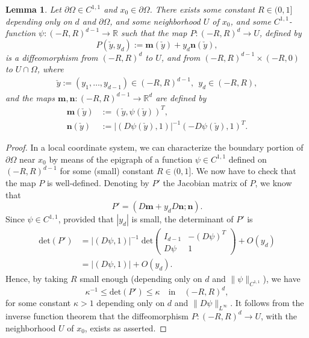\documentclass[10pt]{amsart}
\newtheorem{lemm}[theo]{Lemma}\newtheorem{prop}[theo]{Proposition}\newtheorem{coro}[theo]{Corollary}\newtheorem{conj}[theo]{Conjecture}
\theoremstyle{definition}\newtheorem{defi}[theo]{Definition}\newtheorem{rema}[theo]{Remark}\newtheorem{exam}[theo]{Example}\newtheorem{exem}[theo]{Example}\newtheorem{nota}[theo]{Notation}
\newcommand*\p{\partial}
\renewcommand*\det{\mathrm{det}}
\newcommand*\R {\mathbb{R}}
\newcommand*\mm {\boldsymbol{m}}
\newcommand*\nn {\boldsymbol{n}}
\begin{document}
\begin{lemm}\label{flattening}
Let $\p\Omega\in C^{1,1}$ and $x_0\in\p\Omega$. There exists some constant $R\in(0,1]$ depending only on $d$ and $\p\Omega$, and some neighborhood $U$ of $x_0$, and some $C^{1,1}$-function $\psi:(-R,R)^{d-1} \rightarrow \R$ such that the map $P:(-R,R)^d\rightarrow U$, defined by
\begin{equation}\label{flatten}
P(\check{y},y_d):=\mm(\check{y})+y_d\nn(\check{y}),
\end{equation}
is a diffeomorphism from $(-R,R)^d$ to $U$, and from $(-R,R)^{d-1}\times(-R,0)$ to $U\cap\Omega$, where
\begin{align*}
\check{y}:=(y_1,\ldots,y_{d-1})\in(-R,R)^{d-1},\ \ y_d\in(-R,R),
\end{align*}
and the maps $\mm,\nn:(-R,R)^{d-1} \rightarrow \R^d$ are defined by
\begin{align*}
\mm(\check{y})&:=\left(\check{y},\psi(\check{y})\right)^T,
\\
\nn(\check{y})&:=\left|\left(D\psi(\check{y}),1\right)\right|^{-1}\left(-D\psi(\check{y}),1\right)^T.
\end{align*}
\end{lemm}

\begin{proof}
In a local coordinate system, we can characterize the boundary portion of $\partial\Omega$ near $x_0$ by means of the epigraph of a function $\psi\in C^{1,1}$ defined on $(-R,R)^{d-1}$ for some (small) constant $R\in(0,1]$. We now have to check that the map $P$ is well-defined. Denoting by $P'$ the Jacobian matrix of $P$, we know that
\begin{equation}\label{DP}
P'=\left(D\mm+y_dD\nn;\nn\right).
\end{equation}
Since $\psi\in C^{1,1}$, provided that $|y_d|$ is small, the determinant of $P'$ is
\begin{equation}\label{det}
\begin{split}
\det(P') &=\left|(D\psi,1)\right|^{-1}\;\! \det\!
\begin{pmatrix}
I_{d-1} & -(D\psi)^T \\
D\psi & 1
\end{pmatrix} +O(y_d)\\
&= |(D\psi,1)| + O(y_d).
\end{split}
\end{equation}
Hence, by taking $R$ small enough (depending only on $d$ and $\|\psi\|_{C^{1,1}}$), we have
\begin{equation}\label{detk}
\kappa^{-1}\le \det(P') \le\kappa \quad\text{in}\quad (-R,R)^{d},
\end{equation}
for some constant $\kappa>1$ depending only on $d$ and $\|D\psi\|_{L^\infty}$. It follows from the inverse function theorem that the diffeomorphism $P:(-R,R)^d\rightarrow U$, with the neighborhood $U$ of $x_0$, exists as asserted.
\end{proof}
\end{document}
